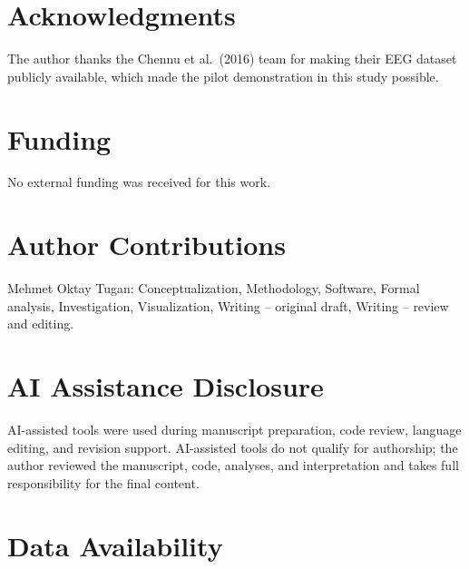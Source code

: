 ﻿\documentclass[11pt,a4paper]{article}
\theoremstyle{plain}
\theoremstyle{definition}
\theoremstyle{remark}
\begin{document}
\newpage
\section*{Acknowledgments}

The author thanks the Chennu et al.\ (2016) team for making their EEG dataset publicly available, which made the pilot demonstration in this study possible.

\section*{Funding}

No external funding was received for this work.

\section*{Author Contributions}

Mehmet Oktay Tugan: Conceptualization, Methodology, Software, Formal analysis, Investigation, Visualization, Writing -- original draft, Writing -- review and editing.

\section*{AI Assistance Disclosure}

AI-assisted tools were used during manuscript preparation, code review, language editing, and revision support. AI-assisted tools do not qualify for authorship; the author reviewed the manuscript, code, analyses, and interpretation and takes full responsibility for the final content.

\section*{Data Availability}
\end{document}
